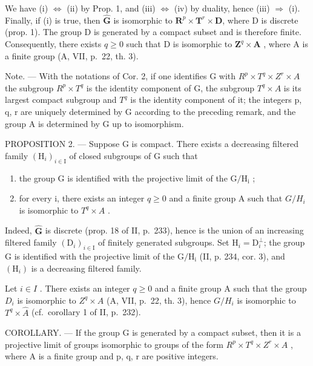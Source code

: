 We have (i) \(\Leftrightarrow\) (ii) by Prop. 1, and (iii) \(\Leftrightarrow\) (iv) by duality, hence (iii) \(\Rightarrow\) (i). Finally, if (i) is true, then \(\widehat{\mathbf{G}}\) is isomorphic to \(\mathbf{R}^{p} \times \mathbf{T}^{r} \times \mathbf{D}\), where D is discrete (prop. 1). The group D is generated by a compact subset and is therefore finite. Consequently, there exists \(q \geqslant 0\) such that D is isomorphic to \(\mathbf{Z}^{q} \times \mathbf{A}\) , where A is a finite group (A, VII, p.~22, th. 3).

Note. --- With the notations of Cor. 2, if one identifies G with \(R^{p} \times T^{q} \times Z^{r} \times A\) the subgroup \(R^{p} \times T^{q}\) is the identity component of G, the subgroup \(T^{q} \times A\) is its largest compact subgroup and \(T^{q}\) is the identity component of it; the integers p, q, r are uniquely determined by G according to the preceding remark, and the group A is determined by G up to isomorphism.

PROPOSITION 2. --- Suppose G is compact. There exists a decreasing filtered family \((\mathrm{H}_{i})_{i\in\mathrm{I}}\) of closed subgroups of G such that

\begin{enumerate}
\def\labelenumi{\alph{enumi})}
\item
  the group G is identified with the projective limit of the \(\mathrm{G / H_i}\) ;
\item
  for every i, there exists an integer \(q \geqslant 0\) and a finite group A such that \(G/H_{i}\) is isomorphic to \(T^{q} \times A\) .
\end{enumerate}

Indeed, \(\widehat{\mathbf{G}}\) is discrete (prop. 18 of II, p.~233), hence is the union of an increasing filtered family \((\mathrm{D}_i)_{i\in \mathrm{I}}\) of finitely generated subgroups. Set \(\mathrm{H}_i = \mathrm{D}_i^\perp\); the group G is identified with the projective limit of the \(\mathrm{G / H_i}\) (II, p. 234, cor. 3), and \((\mathrm{H}_i)\) is a decreasing filtered family.

Let \(i \in I\) . There exists an integer \(q \geqslant 0\) and a finite group A such that the group \(D_{i}\) is isomorphic to \(Z^{q} \times A\) (A, VII, p.~22, th. 3), hence \(G/H_{i}\) is isomorphic to \(T^{q} \times \widehat{A}\) (cf.~corollary 1 of II, p.~232).

COROLLARY. --- If the group G is generated by a compact subset, then it is a projective limit of groups isomorphic to groups of the form \(R^{p} \times T^{q} \times Z^{r} \times A\) , where A is a finite group and p, q, r are positive integers.

